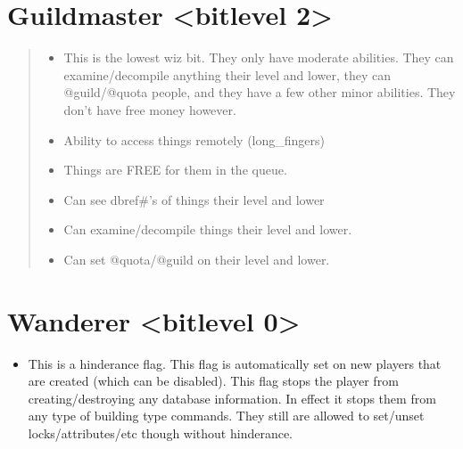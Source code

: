 \documentclass[letterpaper,10pt,english]{sphinxmanual}
\begin{document}
\section{Guildmaster \textless{}bitlevel 2\textgreater{}}
\label{\detokenize{15-bitlevels:guildmaster-bitlevel-2}}\begin{quote}
\begin{itemize}
\item {} 
\sphinxAtStartPar
This is the lowest wiz bit.  They only have moderate abilities.
They can examine/decompile anything their level and lower, they can
@guild/@quota people, and they have a few other minor abilities.
They don’t have free money however.

\end{itemize}
\begin{itemize}
\item {} 
\sphinxAtStartPar
Ability to access things remotely (long\_fingers)

\item {} 
\sphinxAtStartPar
Things are FREE for them in the queue.

\item {} 
\sphinxAtStartPar
Can see dbref\#’s of things their level and lower

\item {} 
\sphinxAtStartPar
Can examine/decompile things their level and lower.

\item {} 
\sphinxAtStartPar
Can set @quota/@guild on their level and lower.

\end{itemize}
\end{quote}


\section{Wanderer \textless{}bitlevel 0\textgreater{}}
\label{\detokenize{15-bitlevels:wanderer-bitlevel-0}}\begin{itemize}
\item {} 
\sphinxAtStartPar
This is a hinderance flag.  This flag is automatically set on new
players that are created (which can be disabled).  This flag stops
the player from creating/destroying any database information.   In
effect it stops them from any type of building type commands.  They
still are allowed to set/unset locks/attributes/etc though without
hinderance.

\end{itemize}
\end{document}
